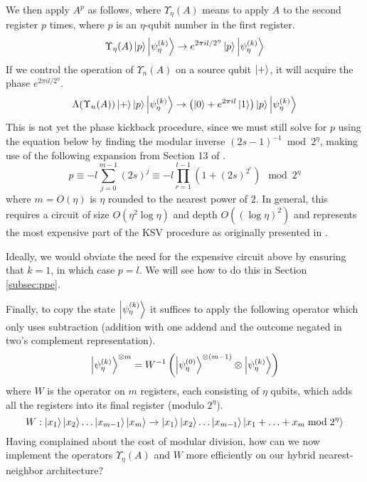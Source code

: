 We then apply $A^p$ as follows, where $\Upsilon_{\eta}(A)$ means to
apply $A$ to the second register $p$ times, where $p$ is an $\eta$-qubit
number in the first register.
%
\begin{equation}
\Upsilon_{\eta}(A) \left\vert{p}\right\rangle\left\vert{\psi_{\eta}^{(k)}}\right\rangle \rightarrow
e^{2\pi i l/2^{\eta}} \left\vert{p}\right\rangle\left\vert{\psi_{\eta}^{(k)}}\right\rangle
\label{eqn:upsilon}
\end{equation}
%
If we control the operation of $\Upsilon_n(A)$ on a source qubit $\left\vert{+}\right\rangle$,
it will acquire the phase $e^{2\pi i l/2^{\eta}}$.
%
\begin{equation}
\Lambda(\Upsilon_n(A))\left\vert{+}\right\rangle\left\vert{p}\right\rangle\left\vert{\psi_{\eta}^{(k)}}\right\rangle \rightarrow
\left( \left\vert{0}\right\rangle + e^{2\pi i l}\left\vert{1}\right\rangle \right) \left\vert{p}\right\rangle\left\vert{\psi_{\eta}^{(k)}}\right\rangle
\end{equation}
%
This is not yet the phase kickback procedure, since
we must still solve for $p$ using the equation below by finding the
modular inverse $(2s - 1)^{-1} \bmod 2^{\eta}$,
making use of the following expansion from Section 13
of \cite{Kitaev2002}.
%
\begin{equation}
p \equiv -l\sum_{j=0}^{m-1} (2s)^j \equiv -l \prod_{r=1}^{t-1}\left(1 + (2s)^{2^r}\right) \mod 2^{\eta}
\label{eqn:mod-inverse}
\end{equation}
%
where $m = O(\eta)$ is $\eta$ rounded to the nearest power of $2$.  In general,
this requires a circuit of size $O(\eta^2 \log \eta)$ and depth $O((\log \eta)^2)$ and
represents the most expensive part of the KSV procedure as originally
presented in \cite{Kitaev2002}.

Ideally, we would obviate the need for the expensive circuit above
by ensuring that $k=1$, in which case
$p = l$. We will see how to do this in Section \ref{subsec:ppe}.

Finally, to copy the state $\left\vert{\psi_{\eta}^{(k)}}\right\rangle$ it suffices to apply the following
operator which only uses subtraction (addition with one addend and the
outcome negated in two's complement representation).
%
\begin{equation}
\left\vert{\psi_{\eta}^{(k)}}\right\rangle^{\otimes m} = W^{-1}\left( \left\vert{\psi_{\eta}^{(0)}}\right\rangle^{\otimes(m-1)} \otimes \left\vert{\psi_{\eta}^{(k)}}\right\rangle \right)
\end{equation}
%
where $W$ is the operator on $m$ registers, each consisting of $\eta$ qubits,
which adds all the registers into its final register (modulo $2^{\eta}$).
%
\begin{equation}
W : \left\vert{x_1}\right\rangle\left\vert{x_2}\right\rangle\ldots\left\vert{x_{m-1}}\right\rangle\left\vert{x_m}\right\rangle \rightarrow
 \left\vert{x_1}\right\rangle\left\vert{x_2}\right\rangle\ldots\left\vert{x_{m-1}}\right\rangle\left\vert{x_1+\ldots+x_m \bmod 2^{\eta}}\right\rangle
\end{equation}
%
Having complained about the cost of modular division, how can we now
implement the operators $\Upsilon_{\eta}(A)$ and $W$ more efficiently on our
hybrid nearest-neighbor architecture?